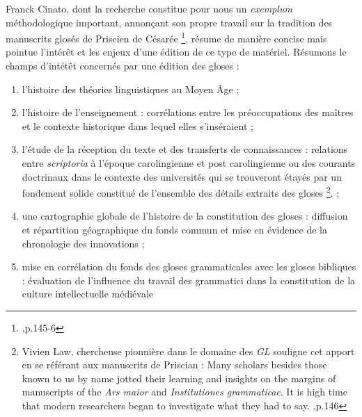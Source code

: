 \documentclass[a4paper, twoside, 12pt]{book}
\begin{document}
Franck Cinato, dont la recherche constitue pour nous un \textit{exemplum} méthodologique important, annonçant son propre travail sur la tradition des manuscrits glosés de Priscien de Césarée \footnote{\cite{cinato2011perspectives},p.145-6}, résume de manière concise mais pointue  l'intérêt et les enjeux d'une édition de ce type de matériel. Résumons le champs d'intétêt concernés par une édition des gloses :
\begin{enumerate}
    \item l'histoire des théories linguistiques au Moyen Âge ;
    \item l'histoire de l’enseignement : corrélations entre les préoccupations des maîtres et le contexte historique dans lequel elles s’inséraient ;
    \item l'étude de la réception du texte et des transferts de connaissances : relations entre \textit{scriptoria} à l’époque carolingienne et post carolingienne ou des courants doctrinaux dans le contexte des universités qui se trouveront étayés par un fondement solide constitué de l’ensemble des détails extraits des gloses \footnote{Vivien Law, chercheuse pionnière dans le domaine des \textit{GL} souligne cet apport en se référant aux manuscrits de Priscian : \og{} Many scholars besides those known to us by name jotted their learning and insights on the margins of manuscripts of the \textit{Ars maior} and \textit{Institutiones grammaticae}. It is high time that modern researchers began to investigate what they had to say. \fg{} \cite{law1997grammar},p.146}. ;
    \item une cartographie globale de l’histoire de la constitution des
    gloses : diffusion et répartition géographique du fonds commun et mise en
    évidence de la chronologie des innovations ;
    \item mise en corrélation du fonds des gloses grammaticales avec les gloses bibliques : évaluation de l’influence du travail des grammatici dans la constitution de la culture intellectuelle médiévale\\
\end{enumerate}
\end{document}

